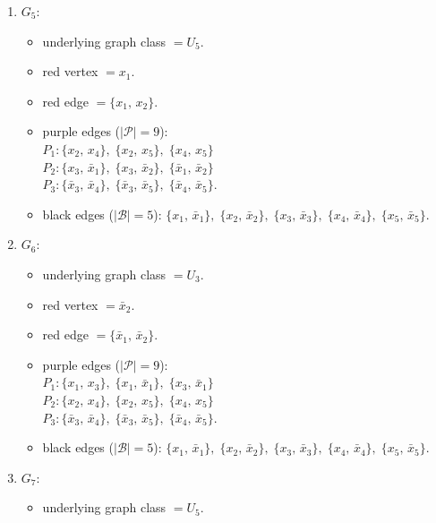 \begin{enumerate}[leftmargin=*]
\begin{itemize}[leftmargin=*]
\item black edges ($|\mathcal{B}|=5$): $\{x_{1},\,\bar{x}_{1}\},\; \{x_{2},\,\bar{x}_{2}\},\; \{x_{3},\,\bar{x}_{3}\},\; \{x_{4},\,\bar{x}_{4}\},\; \{x_{5},\,\bar{x}_{5}\}$.
\end{itemize}
\item $G_{5}$:
\begin{itemize}[leftmargin=*]
\item underlying graph class $= U_5$.
\item red vertex $= x_{1}$.
\item red edge $= \{x_{1},\,x_{2}\}$.
\item purple edges ($|\mathcal{P}|=9$):\mbox{}\\
$P_{1}: \{x_{2},\,x_{4}\},\; \{x_{2},\,x_{5}\},\; \{x_{4},\,x_{5}\}$\\
$P_{2}: \{x_{3},\,\bar{x}_{1}\},\; \{x_{3},\,\bar{x}_{2}\},\; \{\bar{x}_{1},\,\bar{x}_{2}\}$\\
$P_{3}: \{\bar{x}_{3},\,\bar{x}_{4}\},\; \{\bar{x}_{3},\,\bar{x}_{5}\},\; \{\bar{x}_{4},\,\bar{x}_{5}\}$.
\item black edges ($|\mathcal{B}|=5$): $\{x_{1},\,\bar{x}_{1}\},\; \{x_{2},\,\bar{x}_{2}\},\; \{x_{3},\,\bar{x}_{3}\},\; \{x_{4},\,\bar{x}_{4}\},\; \{x_{5},\,\bar{x}_{5}\}$.
\end{itemize}
\item $G_{6}$:
\begin{itemize}[leftmargin=*]
\item underlying graph class $= U_3$.
\item red vertex $= \bar{x}_{2}$.
\item red edge $= \{\bar{x}_{1},\,\bar{x}_{2}\}$.
\item purple edges ($|\mathcal{P}|=9$):\mbox{}\\
$P_{1}: \{x_{1},\,x_{3}\},\; \{x_{1},\,\bar{x}_{1}\},\; \{x_{3},\,\bar{x}_{1}\}$\\
$P_{2}: \{x_{2},\,x_{4}\},\; \{x_{2},\,x_{5}\},\; \{x_{4},\,x_{5}\}$\\
$P_{3}: \{\bar{x}_{3},\,\bar{x}_{4}\},\; \{\bar{x}_{3},\,\bar{x}_{5}\},\; \{\bar{x}_{4},\,\bar{x}_{5}\}$.
\item black edges ($|\mathcal{B}|=5$): $\{x_{1},\,\bar{x}_{1}\},\; \{x_{2},\,\bar{x}_{2}\},\; \{x_{3},\,\bar{x}_{3}\},\; \{x_{4},\,\bar{x}_{4}\},\; \{x_{5},\,\bar{x}_{5}\}$.
\end{itemize}
\item $G_{7}$:
\begin{itemize}[leftmargin=*]
\item underlying graph class $= U_5$.

\end{itemize}
\end{enumerate}
